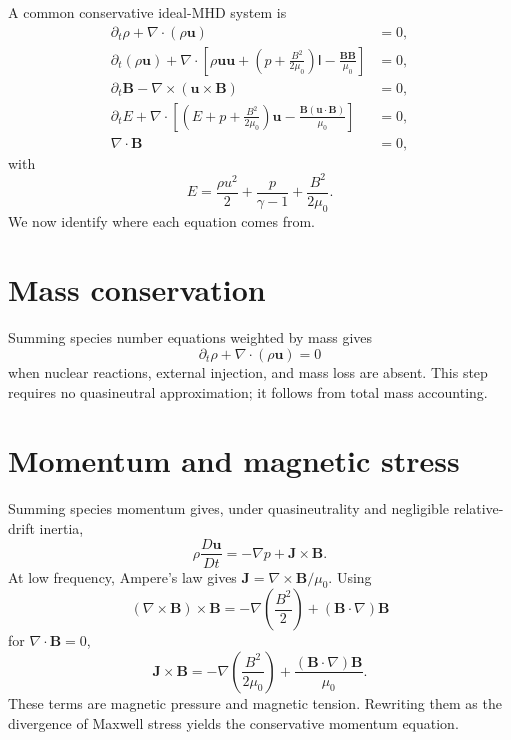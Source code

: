\documentclass[11pt]{article}
\begin{document}
A common conservative ideal-MHD system is
\begin{align}
\partial_t\rho+\nabla\cdot(\rho\mathbf u)&=0,\\
\partial_t(\rho\mathbf u)+\nabla\cdot\left[
\rho\mathbf u\mathbf u+
\left(p+\frac{B^2}{2\mu_0}\right)\mathsf I
-\frac{\mathbf B\mathbf B}{\mu_0}\right]&=0,\\
\partial_t\mathbf B-\nabla\times(\mathbf u\times\mathbf B)&=0,\\
\partial_tE+\nabla\cdot\left[
\left(E+p+\frac{B^2}{2\mu_0}\right)\mathbf u
-\frac{\mathbf B(\mathbf u\cdot\mathbf B)}{\mu_0}\right]&=0,\\
\nabla\cdot\mathbf B&=0,
\end{align}
with
\begin{equation}
E=\frac{\rho u^2}{2}+\frac{p}{\gamma-1}+\frac{B^2}{2\mu_0}.
\end{equation}
We now identify where each equation comes from.


\section{Mass conservation}

Summing species number equations weighted by mass gives
\begin{equation}
\partial_t\rho+\nabla\cdot(\rho\mathbf u)=0
\end{equation}
when nuclear reactions, external injection, and mass loss are absent. This step requires no quasineutral approximation; it follows from total mass accounting.


\section{Momentum and magnetic stress}

Summing species momentum gives, under quasineutrality and negligible relative-drift inertia,
\begin{equation}
\rho\frac{D\mathbf u}{Dt}=-\nabla p+\mathbf J\times\mathbf B.
\end{equation}
At low frequency, Ampere's law gives $\mathbf J=\nabla\times\mathbf B/\mu_0$. Using
\begin{equation}
(\nabla\times\mathbf B)\times\mathbf B
=-\nabla\left(\frac{B^2}{2}\right)+(\mathbf B\cdot\nabla)\mathbf B
\end{equation}
for $\nabla\cdot\mathbf B=0$,
\begin{equation}
\mathbf J\times\mathbf B
=-\nabla\left(\frac{B^2}{2\mu_0}\right)
+\frac{(\mathbf B\cdot\nabla)\mathbf B}{\mu_0}.
\end{equation}
These terms are magnetic pressure and magnetic tension. Rewriting them as the divergence of Maxwell stress yields the conservative momentum equation.
\end{document}
